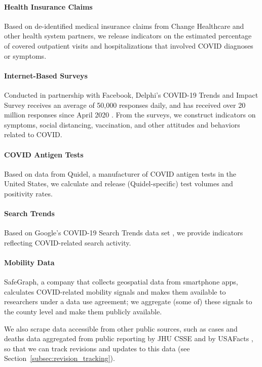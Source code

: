 \documentclass[9pt,twocolumn,twoside,lineno]{pnas-new}
\begin{document}
\paragraph{Health Insurance Claims} Based on de-identified medical insurance
claims from Change Healthcare and other health system partners, we release
indicators on the estimated percentage of covered outpatient visits and
hospitalizations that involved COVID diagnoses or symptoms.

\paragraph{Internet-Based Surveys} Conducted in partnership with Facebook,
Delphi's COVID-19 Trends and Impact Survey receives an average of 50,000 responses
daily, and has received over 20 million responses since April 2020
\cite{Salomon:2021, Kreuter:2020}. From the surveys, we construct indicators on
symptoms, social distancing, vaccination, and other attitudes and behaviors
related to COVID.

\paragraph{COVID Antigen Tests} Based on data from Quidel, a manufacturer of
COVID antigen tests in the United States, we calculate and release
(Quidel-specific) test volumes and positivity rates.

\paragraph{Search Trends} Based on Google's COVID-19 Search Trends data set
\cite{GoogleSymptoms}, we provide indicators reflecting COVID-related search
activity.

\paragraph{Mobility Data} SafeGraph, a company that collects geospatial data
from smartphone apps, calculates COVID-related mobility signals
\cite{SafeGraphSocial, SafeGraphPatterns} and makes them available to
researchers under a data use agreement; we aggregate (some of) these signals to
the county level and make them publicly available.

\medskip
We also scrape data accessible from other public sources, such as cases and
deaths data aggregated from public reporting by JHU CSSE \cite{Dong:2020} and by
USAFacts \cite{USAFacts}, so that we can track revisions and updates to this data
(see Section~\ref{subsec:revision_tracking}).
\end{document}
